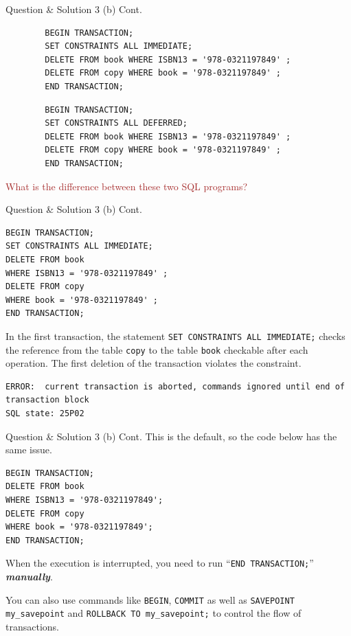 \begin{frame}[fragile]{Question \& Solution 3 (b) Cont.}
	\begin{lstlisting}
		BEGIN TRANSACTION;
		SET CONSTRAINTS ALL IMMEDIATE;
		DELETE FROM book WHERE ISBN13 = '978-0321197849' ;
		DELETE FROM copy WHERE book = '978-0321197849' ;
		END TRANSACTION;
	\end{lstlisting}
	
	\begin{lstlisting}
		BEGIN TRANSACTION;
		SET CONSTRAINTS ALL DEFERRED;
		DELETE FROM book WHERE ISBN13 = '978-0321197849' ;
		DELETE FROM copy WHERE book = '978-0321197849' ;
		END TRANSACTION;
	\end{lstlisting}
\textcolor{brown}{What is the difference between these two SQL programs?}
\end{frame}


\begin{frame}[fragile]{Question \& Solution 3 (b) Cont.}
\begin{lstlisting}
BEGIN TRANSACTION;
SET CONSTRAINTS ALL IMMEDIATE;
DELETE FROM book 
WHERE ISBN13 = '978-0321197849' ;
DELETE FROM copy 
WHERE book = '978-0321197849' ;
END TRANSACTION;
\end{lstlisting}

In the first transaction, the statement \texttt{SET CONSTRAINTS ALL IMMEDIATE;} checks the reference from the table \texttt{copy} to the table \texttt{book} checkable after each operation. The first deletion of the transaction violates the constraint.

\begin{lstlisting}[style=error]
ERROR:  current transaction is aborted, commands ignored until end of transaction block
SQL state: 25P02
\end{lstlisting}

\end{frame}


\begin{frame}[fragile]{Question \& Solution 3 (b) Cont.}
This is the default, so the code below has the same issue.

\begin{lstlisting}
BEGIN TRANSACTION;
DELETE FROM book 
WHERE ISBN13 = '978-0321197849';
DELETE FROM copy 
WHERE book = '978-0321197849';
END TRANSACTION;
\end{lstlisting}

When the execution is interrupted, you need to run ``\texttt{END TRANSACTION;}'' {\color{red} \textbf{\textit{manually}}}. \vspace{10pt}

You can also use commands like \texttt{BEGIN}, \texttt{COMMIT} as well as  \texttt{SAVEPOINT my\_savepoint} and \texttt{ROLLBACK TO my\_savepoint;} to control the flow of transactions.

\end{frame}


